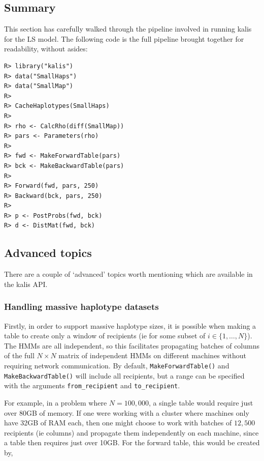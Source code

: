 \documentclass[a4paper]{article}
\newcommand{\pkg}[1]{{\fontseries{m}\fontseries{b}\selectfont #1}}
\begin{document}
\subsection*{Summary}
\label{summary}

This section has carefully walked through the pipeline involved in running \pkg{kalis} for the LS model.
The following code is the full pipeline brought together for readability, without asides:

\begin{verbatim}
R> library("kalis")
R> data("SmallHaps")
R> data("SmallMap")
R>
R> CacheHaplotypes(SmallHaps)
R>
R> rho <- CalcRho(diff(SmallMap))
R> pars <- Parameters(rho)
R>
R> fwd <- MakeForwardTable(pars)
R> bck <- MakeBackwardTable(pars)
R>
R> Forward(fwd, pars, 250)
R> Backward(bck, pars, 250)
R>
R> p <- PostProbs(fwd, bck)
R> d <- DistMat(fwd, bck)
\end{verbatim}



\subsection*{Advanced topics}
\label{sec:advtopics}

There are a couple of `advanced' topics worth mentioning which are available in the \pkg{kalis} API.



\subsubsection*{Handling massive haplotype datasets}
\label{handling-massive-haplotype-datasets}

Firstly, in order to support massive haplotype sizes, it is possible when making a table to create only a window of recipients (ie for some subset of \(i \in \{1, \dots, N\}\)).
The HMMs are all independent, so this facilitates propagating batches of columns of the full \(N \times N\) matrix of independent HMMs on different machines without requiring network communication.
By default, \texttt{MakeForwardTable()} and \texttt{MakeBackwardTable()} will include all recipients, but a range can be specified with the arguments \texttt{from\_recipient} and \texttt{to\_recipient}.

For example, in a problem where \(N = 100,000\), a single table would require just over 80GB of memory.
If one were working with a cluster where machines only have 32GB of RAM each, then one might choose to work with batches of \(12,500\) recipients (ie columns) and propagate them independently on each machine, since a table then requires just over 10GB.
For the forward table, this would be created by,
\end{document}
